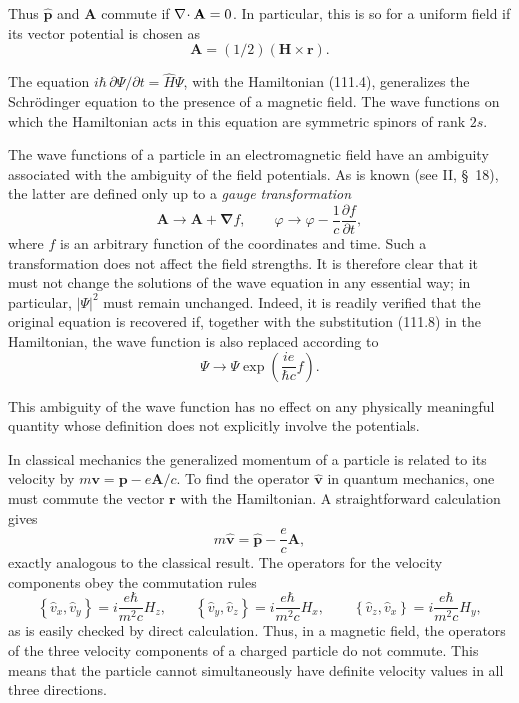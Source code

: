 Thus $\hat{\mathbf p}$ and $\mathbf A$ commute if $\nabla\!\cdot \mathbf A=0$. In particular, this is so for a uniform field if its vector potential is chosen as
\begin{equation}
 \mathbf A=(1/2)(\mathbf H\times\mathbf r).
 \tag{111.7}
\end{equation}

The equation $i\hbar\,\partial\Psi/\partial t=\hat H\Psi$, with the Hamiltonian (111.4), generalizes the Schrödinger equation to the presence of a magnetic field. The wave functions on which the Hamiltonian acts in this equation are symmetric spinors of rank $2s$.

The wave functions of a particle in an electromagnetic field have an ambiguity associated with the ambiguity of the field potentials. As is known (see II, \S~18), the latter are defined only up to a \emph{gauge transformation}
\begin{equation}
 \mathbf A\to\mathbf A+\boldsymbol\nabla f,\qquad
 \varphi\to\varphi-\frac1c\frac{\partial f}{\partial t},
 \tag{111.8}
\end{equation}
where $f$ is an arbitrary function of the coordinates and time. Such a transformation does not affect the field strengths. It is therefore clear that it must not change the solutions of the wave equation in any essential way; in particular, $|\Psi|^2$ must remain unchanged. Indeed, it is readily verified that the original equation is recovered if, together with the substitution (111.8) in the Hamiltonian, the wave function is also replaced according to
\begin{equation}
 \Psi\to\Psi\exp\left(\frac{ie}{\hbar c}f\right).
 \tag{111.9}
\end{equation}

This ambiguity of the wave function has no effect on any physically meaningful quantity whose definition does not explicitly involve the potentials.

In classical mechanics the generalized momentum of a particle is related to its velocity by $m\mathbf v=\mathbf p-e\mathbf A/c$. To find the operator $\hat{\mathbf v}$ in quantum mechanics, one must commute the vector $\mathbf r$ with the Hamiltonian. A straightforward calculation gives
\begin{equation}
 m\hat{\mathbf v}=\hat{\mathbf p}-\frac ec\mathbf A,
 \tag{111.10}
\end{equation}
exactly analogous to the classical result. The operators for the velocity components obey the commutation rules
\begin{equation}
 \left\{\hat v_x,\hat v_y\right\}=i\frac{e\hbar}{m^2c}H_z,\qquad
 \left\{\hat v_y,\hat v_z\right\}=i\frac{e\hbar}{m^2c}H_x,\qquad
 \left\{\hat v_z,\hat v_x\right\}=i\frac{e\hbar}{m^2c}H_y,
 \tag{111.11}
\end{equation}
as is easily checked by direct calculation. Thus, in a magnetic field, the operators of the three velocity components of a charged particle do not commute. This means that the particle cannot simultaneously have definite velocity values in all three directions.

